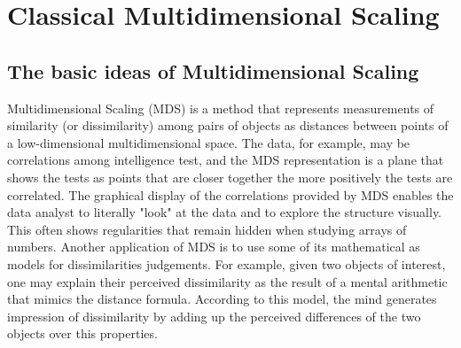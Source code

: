 \documentclass[11pt]{report}
\begin{document}









\thispagestyle{empty}






\clearpage



\tableofcontents



\chapter{Classical Multidimensional Scaling}
\section{The basic ideas of Multidimensional Scaling}
Multidimensional Scaling (MDS) is a method that represents measurements of 
similarity (or dissimilarity) among pairs of objects as distances between points
of a low-dimensional multidimensional space. The data, for example, may be 
correlations among intelligence test, and the MDS representation is a plane that
shows the tests as points that are closer together the more positively the tests
are correlated. The graphical display of the correlations provided by MDS 
enables the data analyst to literally "look" at the data and to explore the 
structure visually. This often shows regularities that remain hidden when
studying arrays of numbers. Another application of MDS is to use some of its
mathematical as models for dissimilarities judgements. For example, given two
objects of interest, one may explain their perceived dissimilarity as the result
of a mental arithmetic that mimics the distance formula. According to this model,
the mind generates impression of dissimilarity by adding up the perceived 
differences of the two objects over this properties.
\end{document}
